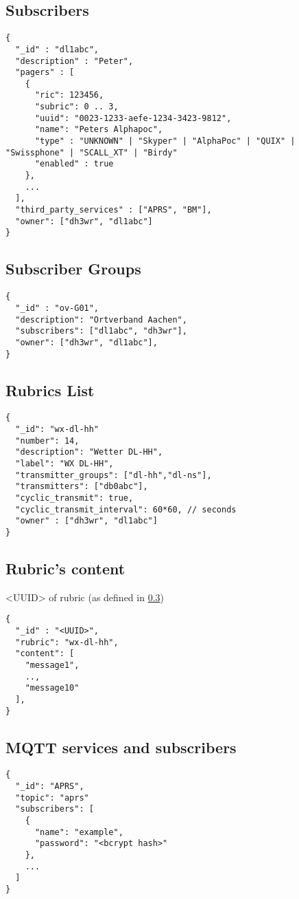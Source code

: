 \subsection{Subscribers}
\label{protocoldef:couchdb:subscribers}
\begin{lstlisting}
{
  "_id" : "dl1abc",
  "description" : "Peter",
  "pagers" : [
    {
      "ric": 123456,
      "subric": 0 .. 3,
      "uuid": "0023-1233-aefe-1234-3423-9812",
      "name": "Peters Alphapoc",
      "type" : "UNKNOWN" | "Skyper" | "AlphaPoc" | "QUIX" | "Swissphone" | "SCALL_XT" | "Birdy"
      "enabled" : true
    },
    ...
  ],
  "third_party_services" : ["APRS", "BM"],
  "owner": ["dh3wr", "dl1abc"]
}
\end{lstlisting}

\subsection{Subscriber Groups}

\begin{lstlisting}
{
  "_id" : "ov-G01",
  "description": "Ortverband Aachen",
  "subscribers": ["dl1abc", "dh3wr"],
  "owner": ["dh3wr", "dl1abc"],
}
\end{lstlisting}

\subsection{Rubrics List}
\label{rubric_list}

\begin{lstlisting}
{
  "_id": "wx-dl-hh"
  "number": 14,
  "description": "Wetter DL-HH",
  "label": "WX DL-HH",
  "transmitter_groups": ["dl-hh","dl-ns"],
  "transmitters": ["db0abc"],
  "cyclic_transmit": true,
  "cyclic_transmit_interval": 60*60, // seconds
  "owner" : ["dh3wr", "dl1abc"]
}
\end{lstlisting}

\subsection{Rubric's content}
<UUID> of rubric (as defined in \ref{rubric_list})

\begin{lstlisting}
{
  "_id" : "<UUID>",
  "rubric": "wx-dl-hh",
  "content": [
    "message1",
    ..,
    "message10"
  ],
}
\end{lstlisting}

\subsection{MQTT services and subscribers}
\label{protocoldef:couchdb:mqttservicesandsubscribers}
\begin{lstlisting}
{
  "_id": "APRS",
  "topic": "aprs"
  "subscribers": [
    {
      "name": "example",
      "password": "<bcrypt hash>"
    },
    ...
  ]
}
\end{lstlisting}
